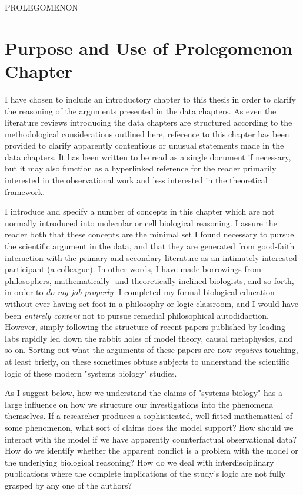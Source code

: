PROLEGOMENON

\section{Purpose and Use of Prolegomenon Chapter}
I have chosen to include an introductory chapter to this thesis in order to clarify the reasoning of the arguments presented in the data chapters. As even the literature reviews introducing the data chapters are structured according to the methodological considerations outlined here, reference to this chapter has been provided to clarify apparently contentious or unusual statements made in the data chapters. It has been written to be read as a single document if necessary, but it may also function as a hyperlinked reference for the reader primarily interested in the observational work and less interested in the theoretical framework.

I introduce and specify a number of concepts in this chapter which are not normally introduced into molecular or cell biological reasoning. I assure the reader both that these concepts are the minimal set I found necessary to pursue the scientific argument in the data, and that they are generated from good-faith interaction with the primary and secondary literature as an intimately interested participant (a colleague). In other words, I have made borrowings from philosophers, mathematically- and theoretically-inclined biologists, and so forth, in order to \textit{do my job properly}- I completed my formal biological education without ever having set foot in a philosophy or logic classroom, and I would have been \textit{entirely content} not to pursue remedial philosophical autodidaction. However, simply following the structure of recent papers published by leading labs rapidly led down the rabbit holes of model theory, causal metaphysics, and so on. Sorting out what the arguments of these papers are now \textit{requires} touching, at least briefly, on these sometimes obtuse subjects to understand the scientific logic of these modern "systems biology" studies. 

As I suggest below, how we understand the claims of "systems biology" has a large influence on how we structure our investigations into the phenomena themselves. If a researcher produces a sophisticated, well-fitted mathematical of some phenomenon, what sort of claims does the model support? How should we interact with the model if we have apparently counterfactual observational data? How do we identify whether the apparent conflict is a problem with the model or the underlying biological reasoning? How do we deal with interdisciplinary publications where the complete implications of the study's logic are not fully grasped by any one of the authors?

